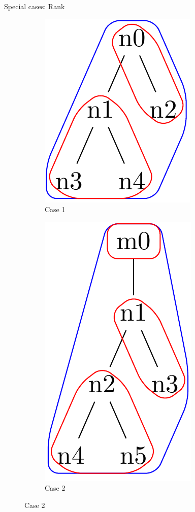 \documentclass{beamer}
\begin{document}
\begin{frame}{Special cases: Rank}
	\begin{figure}[ht]
	\begin{subfigure}{2cm}
		\includegraphics[scale=0.22]{F4C1Tree}
		\caption{Case 1}
		\label{rank:subim1}
	\end{subfigure}
	\begin{subfigure}{2cm}
		\includegraphics[scale=0.21]{F4C2Tree}
		\caption{Case 2}
		\label{rank:subim2}

\end{subfigure}
\end{figure}
\end{frame}
\end{document}
